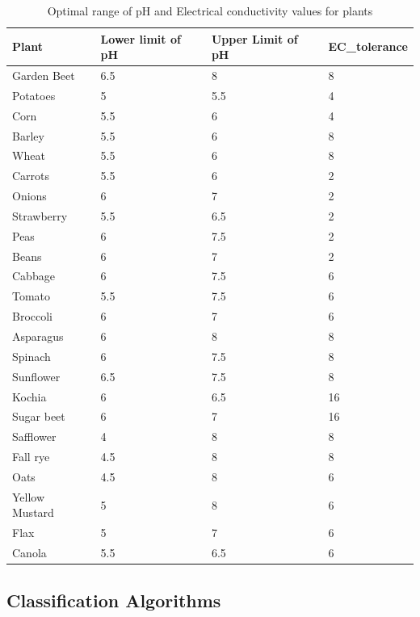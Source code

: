 \begin{table}[H]
    \centering
    \begin{tabular}{|l|l|l|l|}
    \hline
        \textbf{Plant} & \textbf{Lower limit of pH} & \textbf{Upper Limit of pH} & \textbf{EC\_tolerance} \\ \hline
        Garden Beet & 6.5 & 8 & 8 \\ \hline
        Potatoes & 5 & 5.5 & 4 \\ \hline
        Corn & 5.5 & 6 & 4 \\ \hline
        Barley & 5.5 & 6 & 8 \\ \hline
        Wheat & 5.5 & 6 & 8 \\ \hline
        Carrots & 5.5 & 6 & 2 \\ \hline
        Onions & 6 & 7 & 2 \\ \hline
        Strawberry & 5.5 & 6.5 & 2 \\ \hline
        Peas & 6 & 7.5 & 2 \\ \hline
        Beans & 6 & 7 & 2 \\ \hline
        Cabbage & 6 & 7.5 & 6 \\ \hline
        Tomato & 5.5 & 7.5 & 6 \\ \hline
        Broccoli & 6 & 7 & 6 \\ \hline
        Asparagus & 6 & 8 & 8 \\ \hline
        Spinach & 6 & 7.5 & 8 \\ \hline
        Sunflower & 6.5 & 7.5 & 8 \\ \hline
        Kochia & 6 & 6.5 & 16 \\ \hline
        Sugar beet & 6 & 7 & 16 \\ \hline
        Safflower & 4 & 8 & 8 \\ \hline
        Fall rye & 4.5 & 8 & 8 \\ \hline
        Oats & 4.5 & 8 & 6 \\ \hline
        Yellow Mustard & 5 & 8 & 6 \\ \hline
        Flax & 5 & 7 & 6 \\ \hline
        Canola & 5.5 & 6.5 & 6 \\ \hline
    \end{tabular}
    \caption{Optimal range of pH and Electrical conductivity values for plants}
    \label{table:phAndECRanges}
\end{table}

\subsection{Classification Algorithms}
\label{subsection:classificationAlgos}

